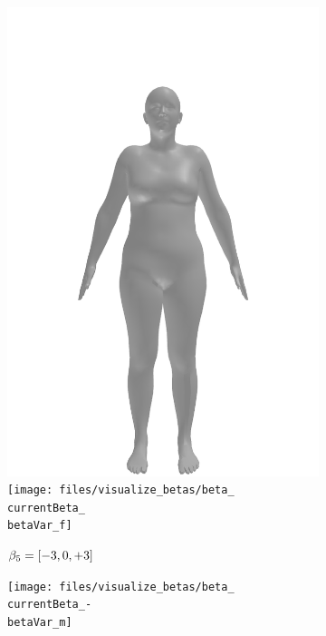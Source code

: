 \begin{figure}[ht!]
\begin{subfigure}{\betaWidth}
        \includegraphics[width=\imgWidth]{files/visualize_betas/baseline_f}
        \texttt{[image: files/visualize\_betas/beta\_\\currentBeta\_\\betaVar\_f]}
        \caption{$\beta_5 = [-3, 0, +3]$}
    \end{subfigure}
    \begin{subfigure}{\betaWidth}
        \def\currentBeta{5}
        \centering
        \texttt{[image: files/visualize\_betas/beta\_\\currentBeta\_-\\betaVar\_m]}

\end{subfigure}
\end{figure}
